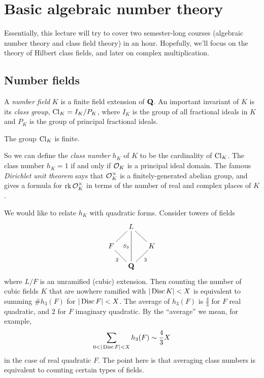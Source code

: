 
\section{Basic algebraic number theory}





Essentially, this lecture will try to cover two semester-long courses 
(algebraic number theory and class field theory) in an hour. Hopefully, we'll 
focus on the theory of Hilbert class fields, and later on complex 
multiplication. 





\subsection{Number fields}

A \emph{number field} $K$ is a finite field extension of $\mathbf{Q}$. An important 
invariant of $K$ is its \emph{class group}, $\operatorname{Cl}_K=I_K/P_K$, where 
$I_K$ is the group of all fractional ideals in $K$ and $P_K$ is the group of 
principal fractional ideals. 

\begin{theo}
The group $\operatorname{Cl}_K$ is finite. 
\end{theo}

So we can define the \emph{class number} $h_K$ of $K$ to be the cardinality 
of $\operatorname{Cl}_K$. The class number $h_K=1$ if and only if $\mathcal{O}_K$ is a principal 
ideal domain. The famous \emph{Dirichlet unit theorem} says that $\mathcal{O}_K^\times$ 
is a finitely-generated abelian group, and gives a formula for 
$\operatorname{rk}\mathcal{O}_K^\times$ in terms of the number of real and complex places of $K$. 

We would like to relate $h_K$ with quadratic forms. Consider towers of 
fields 
\[\xymatrix@=0.5cm{
  & L \\
  F \ar@{-}[ur] & & K \ar@{-}[ul] \\
  & \dQ \ar@{-}[ul]^-2 \ar@{-}[ur]_-3 \ar@{-}[uu]^-{S_3} 
}\]
where $L/F$ is an unramified (cubic) extension. Then counting the number of 
cubic fields $K$ that are nowhere ramified with $|\operatorname{Disc} K|<X$ is 
equivalent to summing $\# h_3(F)$ for $|\operatorname{Disc} F|<X$. The average of 
$h_3(F)$ is $\frac 4 3$ for $F$ real quadratic, and $2$ for $F$ imaginary 
quadratic. By the ``average'' we mean, for example, 
\[
  \sum_{0<|\discriminant F|<X} h_3(F) \sim \frac 4 3 X 
\]
in the case of real quadratic $F$. The point here is that averaging class 
numbers is equivalent to counting certain types of fields. 





